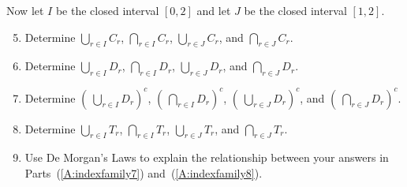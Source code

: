 \begin{enumerate}
\noindent
Now let $I$ be the closed interval $[0, 2]$ and let $J$ be the closed interval $[1, 2]$.
\begin{enumerate} \setcounter{enumii}{4}
\item Determine $\bigcup\limits_{r \in I}^{}C_r$, $\bigcap\limits_{r \in I}^{}C_r$, $\bigcup\limits_{r \in J}^{}C_r$, and $\bigcap\limits_{r \in J}^{}C_r$.

\item Determine $\bigcup\limits_{r \in I}^{}D_r$, $\bigcap\limits_{r \in I}^{}D_r$, $\bigcup\limits_{r \in J}^{}D_r$, and $\bigcap\limits_{r \in J}^{}D_r$.

\item Determine $\left(\: \bigcup\limits_{r \in I}^{}D_r \right)^c$, 
$\left(\: \bigcap\limits_{r \in I}^{}D_r \right)^c$, 
$\left(\: \bigcup\limits_{r \in J}^{}D_r \right)^c$, and 
$\left(\: \bigcap\limits_{r \in J}^{}D_r \right)^c$.
\label{A:indexfamily7}%


\item Determine $\bigcup\limits_{r \in I}^{}T_r$, $\bigcap\limits_{r \in I}^{}T_r$, $\bigcup\limits_{r \in J}^{}T_r$, and $\bigcap\limits_{r \in J}^{}T_r$.
\label{A:indexfamily8}%

\item Use De Morgan's Laws to explain the relationship between your answers in 
Parts~(\ref{A:indexfamily7}) and~(\ref{A:indexfamily8}).
\end{enumerate}
\end{enumerate}


\hbreak
\endinput
